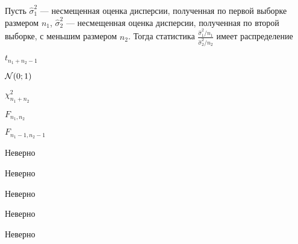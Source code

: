 
\begin{question}
Пусть \(\hat{\sigma}^2_1\) — несмещенная оценка дисперсии, полученная
по первой выборке размером \(n_1\), \(\hat{\sigma}^2_2\) — несмещенная
оценка дисперсии, полученная по второй выборке, с меньшим размером
\(n_2\). Тогда статистика
\(\frac{\hat{\sigma}^2_1/n_1}{\hat{\sigma}^2_2/n_2}\) имеет
распределение
\begin{answerlist}
  \item \(t_{n_1+n_2-1}\)
  \item \(\mathcal{N}(0;1)\)
  \item \(\chi^2_{n_1+n_2}\)
  \item \(F_{n_1,n_2}\)
  \item \(F_{n_1-1,n_2-1}\)
\end{answerlist}
\end{question}

\begin{solution}
\begin{answerlist}
  \item Неверно
  \item Неверно
  \item Неверно
  \item Неверно
  \item Неверно
\end{answerlist}
\end{solution}

